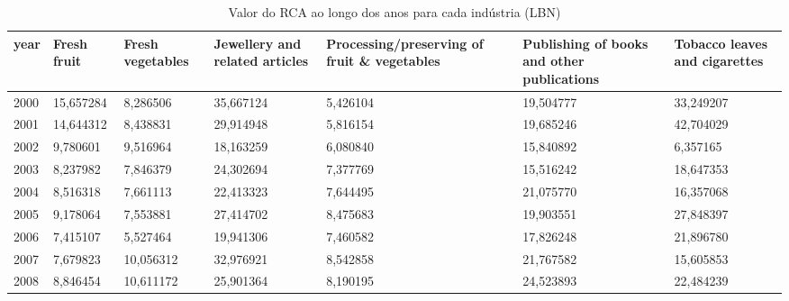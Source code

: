 \begin{table}
\centering
\caption{Valor do RCA ao longo dos anos para cada indústria (LBN)}
\begin{tabular}{p{1cm}p{2cm}p{2cm}p{2cm}p{2cm}p{2cm}p{2cm}}
\toprule
 year &  Fresh fruit &  Fresh vegetables &  Jewellery and related articles &  Processing/preserving of fruit \& vegetables &  Publishing of books and other publications &  Tobacco leaves and cigarettes \\
\midrule
 2000 &    15,657284 &          8,286506 &                       35,667124 &                                     5,426104 &                                   19,504777 &                      33,249207 \\
 2001 &    14,644312 &          8,438831 &                       29,914948 &                                     5,816154 &                                   19,685246 &                      42,704029 \\
 2002 &     9,780601 &          9,516964 &                       18,163259 &                                     6,080840 &                                   15,840892 &                       6,357165 \\
 2003 &     8,237982 &          7,846379 &                       24,302694 &                                     7,377769 &                                   15,516242 &                      18,647353 \\
 2004 &     8,516318 &          7,661113 &                       22,413323 &                                     7,644495 &                                   21,075770 &                      16,357068 \\
 2005 &     9,178064 &          7,553881 &                       27,414702 &                                     8,475683 &                                   19,903551 &                      27,848397 \\
 2006 &     7,415107 &          5,527464 &                       19,941306 &                                     7,460582 &                                   17,826248 &                      21,896780 \\
 2007 &     7,679823 &         10,056312 &                       32,976921 &                                     8,542858 &                                   21,767582 &                      15,605853 \\
 2008 &     8,846454 &         10,611172 &                       25,901364 &                                     8,190195 &                                   24,523893 &                      22,484239 \\

\end{tabular}
\end{table}
